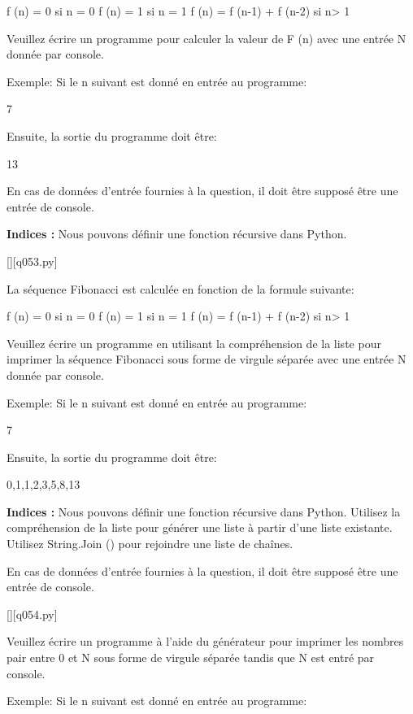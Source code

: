 f (n) = 0 si n = 0
f (n) = 1 si n = 1
f (n) = f (n-1) + f (n-2) si n> 1

Veuillez écrire un programme pour calculer la valeur de F (n) avec une entrée N donnée par console.

Exemple:
Si le n suivant est donné en entrée au programme:

7

Ensuite, la sortie du programme doit être:

13

En cas de données d'entrée fournies à la question, il doit être supposé être une entrée de console.
\par
\textbf{Indices : }Nous pouvons définir une fonction récursive dans Python.
\renewcommand{\nomfichier}{q053.py}
\begin{solution}
    \pythonfile{\chemincode \nomfichier}[][\nomfichier]
\end{solution}


\question
La séquence Fibonacci est calculée en fonction de la formule suivante:


f (n) = 0 si n = 0
f (n) = 1 si n = 1
f (n) = f (n-1) + f (n-2) si n> 1

Veuillez écrire un programme en utilisant la compréhension de la liste pour imprimer la séquence Fibonacci sous forme de virgule séparée avec une entrée N donnée par console.

Exemple:
Si le n suivant est donné en entrée au programme:

7

Ensuite, la sortie du programme doit être:

0,1,1,2,3,5,8,13
\par
\textbf{Indices : }Nous pouvons définir une fonction récursive dans Python.
Utilisez la compréhension de la liste pour générer une liste à partir d'une liste existante.
Utilisez String.Join () pour rejoindre une liste de chaînes.

En cas de données d'entrée fournies à la question, il doit être supposé être une entrée de console.
\renewcommand{\nomfichier}{q054.py}
\begin{solution}
    \pythonfile{\chemincode \nomfichier}[][\nomfichier]
\end{solution}


\question
Veuillez écrire un programme à l'aide du générateur pour imprimer les nombres pair entre 0 et N sous forme de virgule séparée tandis que N est entré par console.

Exemple:
Si le n suivant est donné en entrée au programme:

